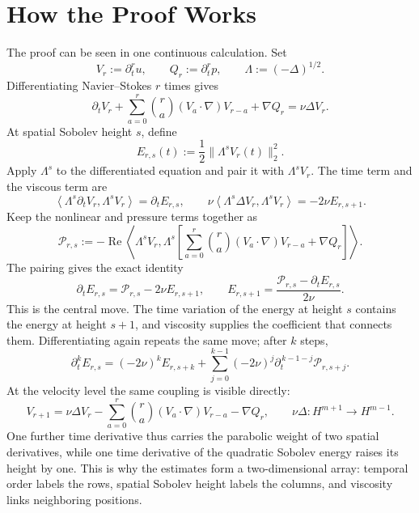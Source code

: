 \begingroup
\small
\setlength{\parindent}{0pt}
\setlength{\parskip}{0.55\baselineskip}
\setlength{\abovedisplayskip}{8pt plus 2pt minus 2pt}
\setlength{\belowdisplayskip}{8pt plus 2pt minus 2pt}
\setlength{\jot}{4pt}

\section*{How the Proof Works}

The proof can be seen in one continuous calculation.  Set
\[
V_r:=\partial_t^r u,
\qquad
Q_r:=\partial_t^r p,
\qquad
\Lambda:=(-\Delta)^{1/2}.
\]
Differentiating Navier--Stokes \(r\) times gives
\[
\partial_tV_r
+\sum_{a=0}^{r}\binom ra(V_a\!\cdot\nabla)V_{r-a}
+\nabla Q_r
=\nu\Delta V_r.
\]
At spatial Sobolev height \(s\), define
\[
E_{r,s}(t):=\frac12\|\Lambda^sV_r(t)\|_2^2.
\]
Apply \(\Lambda^s\) to the differentiated equation and pair it with
\(\Lambda^sV_r\).  The time term and the viscous term are
\[
\left\langle\Lambda^s\partial_tV_r,\Lambda^sV_r\right\rangle
=\partial_tE_{r,s},
\qquad
\nu\left\langle\Lambda^s\Delta V_r,\Lambda^sV_r\right\rangle
=-2\nu E_{r,s+1}.
\]
Keep the nonlinear and pressure terms together as
\[
\mathcal P_{r,s}
:=-\operatorname{Re}
\left\langle
\Lambda^sV_r,
\Lambda^s\!\left[
\sum_{a=0}^{r}\binom ra(V_a\!\cdot\nabla)V_{r-a}
+\nabla Q_r
\right]
\right\rangle.
\]
The pairing gives the exact identity
\[
\boxed{
\partial_tE_{r,s}=\mathcal P_{r,s}-2\nu E_{r,s+1},
\qquad
E_{r,s+1}
=\frac{\mathcal P_{r,s}-\partial_tE_{r,s}}{2\nu}.
}
\]
This is the central move.  The time variation of the energy at height \(s\)
contains the energy at height \(s+1\), and viscosity supplies the coefficient
that connects them.  Differentiating again repeats the same move; after \(k\)
steps,
\[
\boxed{
\partial_t^kE_{r,s}
=(-2\nu)^kE_{r,s+k}
+\sum_{j=0}^{k-1}(-2\nu)^j
\partial_t^{\,k-1-j}\mathcal P_{r,s+j}.
}
\]
At the velocity level the same coupling is visible directly:
\[
V_{r+1}
=\nu\Delta V_r
-\sum_{a=0}^{r}\binom ra(V_a\!\cdot\nabla)V_{r-a}
-\nabla Q_r,
\qquad
\nu\Delta:H^{m+1}\longrightarrow H^{m-1}.
\]
One further time derivative thus carries the parabolic weight of two spatial
derivatives, while one time derivative of the quadratic Sobolev energy raises
its height by one.  This is why the estimates form a two-dimensional array:
temporal order labels the rows, spatial Sobolev height labels the columns, and
viscosity links neighboring positions.

